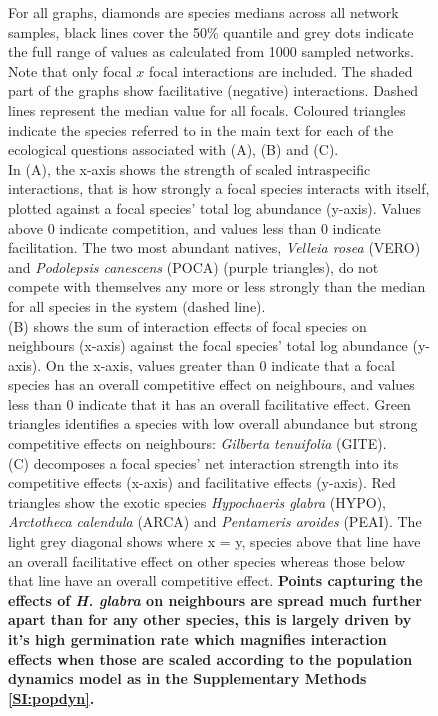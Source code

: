 \documentclass[a4,12pt]{article}
\begin{document}
    \addtocounter{figure}{-1}
    \begin{figure} [t!]
        \caption{For all graphs, diamonds are species medians across all network samples, black lines cover the 50\% quantile and grey dots indicate the full range of values as calculated from 1000 sampled networks. Note that only focal $x$ focal interactions are included. The shaded part of the graphs show facilitative (negative) interactions. Dashed lines represent the median value for all focals. Coloured triangles indicate the species referred to in the main text for each of the ecological questions associated with (A), (B) and (C). \\
        In (A), the x-axis shows the strength of scaled intraspecific interactions, that is how strongly a focal species interacts with itself, plotted against a focal species' total log abundance (y-axis). Values above $0$ indicate competition, and values less than $0$ indicate facilitation.  The two most abundant natives, \textit{Velleia rosea} (VERO) and \textit{Podolepsis canescens} (POCA) (purple triangles), do not compete with themselves any more or less strongly than the median for all species in the system (dashed line). \\
        (B) shows the sum of interaction effects of focal species on neighbours (x-axis) against the focal species' total log abundance (y-axis). On the x-axis, values greater than $0$ indicate that a focal species has an overall competitive effect on neighbours, and values less than $0$ indicate that it has an overall facilitative effect. Green triangles identifies a species with low overall abundance but strong competitive effects on neighbours: \textit{Gilberta tenuifolia} (GITE). \\
        (C) decomposes a focal species' net interaction strength into its competitive effects (x-axis) and facilitative effects (y-axis). Red triangles show the exotic species \textit{Hypochaeris glabra} (HYPO), \textit{Arctotheca calendula} (ARCA) and \textit{Pentameris aroides} (PEAI). The light grey diagonal shows where x = y, species above that line have an overall facilitative effect on other species whereas those below that line have an overall competitive effect. \textbf{Points capturing the effects of \textit{H. glabra} on neighbours are spread much further apart than for any other species, this is largely driven by it's high germination rate which magnifies interaction effects when those are scaled according to the population dynamics model as in the Supplementary Methods \ref{SI:popdyn}.}} 
    \end{figure}

\clearpage
\newpage



\end{document}
